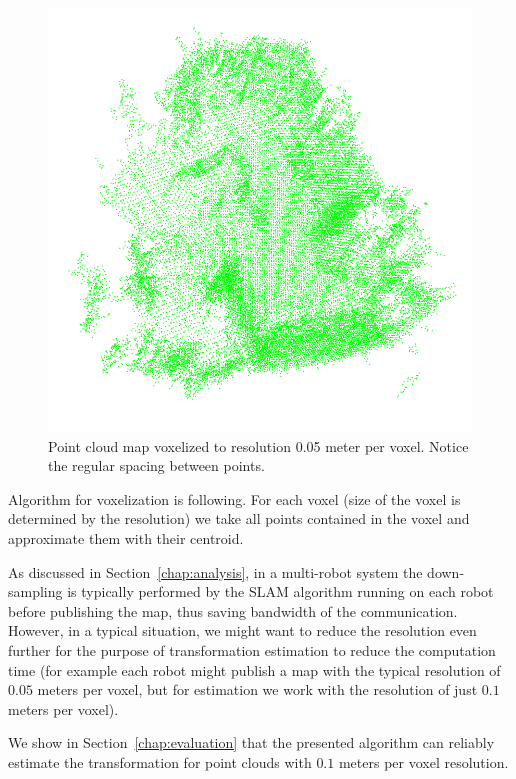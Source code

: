 \begin{figure}
    \centering
    \includegraphics[width=\textwidth]{../img/v1-downsampled.png}
    \caption[Voxelized point cloud map]{Point cloud map voxelized to resolution 0.05 meter per voxel. Notice the regular spacing between points.}
    \label{fig:v1-downsampled}
\end{figure}

Algorithm for voxelization is following. For each voxel (size of the voxel is determined by the resolution) we take all points contained in the voxel and approximate them with their centroid.

As discussed in Section~\ref{chap:analysis}, in a multi-robot system the down-sampling is typically performed by the \gls{SLAM} algorithm running on each robot before publishing the map, thus saving bandwidth of the communication. However, in a typical situation, we might want to reduce the resolution even further for the purpose of transformation estimation to reduce the computation time (for example each robot might publish a map with the typical resolution of $0.05$ meters per voxel, but for estimation we work with the resolution of just $0.1$ meters per voxel).

We show in Section~\ref{chap:evaluation} that the presented algorithm can reliably estimate the transformation for point clouds with $0.1$ meters per voxel resolution.

